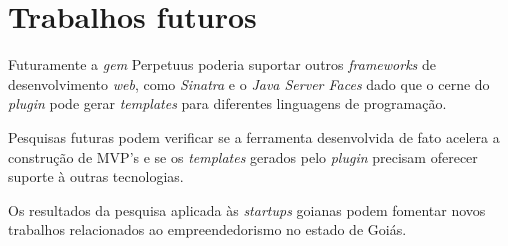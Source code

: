 \section{Trabalhos futuros}

Futuramente a \emph{gem} Perpetuus poderia suportar outros \emph{frameworks} de desenvolvimento \emph{web}, como \emph{Sinatra} e o \emph{Java Server Faces} dado que o cerne do \emph{plugin} pode gerar \emph{templates} para diferentes linguagens de programa\c{c}\~ao.

Pesquisas futuras podem verificar se a ferramenta desenvolvida de fato acelera a constru\c{c}\~ao de MVP's e se os \emph{templates} gerados pelo \emph{plugin} precisam oferecer suporte à outras tecnologias.

Os resultados da pesquisa aplicada \`as \emph{startups} goianas podem fomentar novos trabalhos relacionados ao empreendedorismo no estado de Goi\'as.